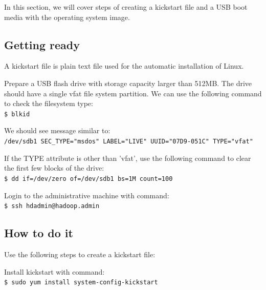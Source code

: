 In this section, we will cover steps of creating a kickstart file and a USB boot media with the operating system image.
\subsection*{Getting ready}
A kickstart file is plain text file used for the automatic installation of Linux.

Prepare a USB flash drive with storage capacity larger than 512MB. The drive should have a single vfat file system partition. We can use the following command to check the filesystem type: \\
\verb|$ blkid|

We should see message similar to: \\
\verb|/dev/sdb1 SEC_TYPE="msdos" LABEL="LIVE" UUID="07D9-051C" TYPE="vfat"|

If the TYPE attribute is other than 'vfat', use the following command to clear the first few blocks of the drive: \\
\verb|$ dd if=/dev/zero of=/dev/sdb1 bs=1M count=100|

Login to the administrative machine with command: \\
\verb|$ ssh hdadmin@hadoop.admin|

\subsection*{How to do it}
Use the following steps to create a kickstart file:

Install kickstart with command: \\
\verb|$ sudo yum install system-config-kickstart|

